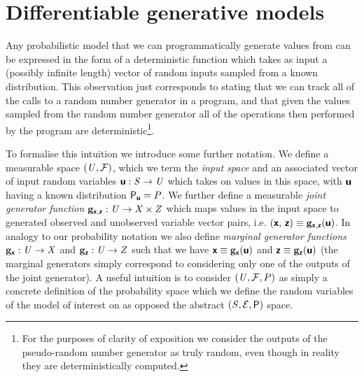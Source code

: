 \section[Differentiable generative models]{Differentiable generative models}\label{sec:differentiable-generative-models}

Any probabilistic model that we can programmatically generate values from can be expressed in the form of a deterministic function which takes as input a (possibly infinite length) vector of random inputs sampled from a known distribution. This observation just corresponds to stating that we can track all of the calls to a random number generator in a program, and that given the values sampled from the random number generator all of the operations then performed by the program are deterministic\footnote{For the purposes of clarity of exposition we consider the outputs of the pseudo-random number generator as truly random, even though in reality they are deterministically computed.}.

To formalise this intuition we introduce some further notation. We define a measurable space $(\mathit{U},\mathcal{F})$, which we term the \emph{input space} and an associated vector of input random variables $\boldsymbol{\mathsf{u}} : \mathit{S} \to \mathit{U}$ which takes on values in this space, with $\boldsymbol{\mathsf{u}}$ having a known distribution $\mathsf{P}_{\boldsymbol{\mathsf{u}}} = P$. We further define a measurable \emph{joint generator function} ${\mathbf{g}}_{\boldsymbol{\mathsf{x}},\boldsymbol{\mathsf{z}}} : \mathit{U} \to \mathit{X} \times \mathit{Z}$ which maps values in the input space to generated observed and unobserved variable vector pairs, i.e. $(\boldsymbol{\mathsf{x}},\,\boldsymbol{\mathsf{z}}) \equiv {\mathbf{g}}_{\boldsymbol{\mathsf{x}},\boldsymbol{\mathsf{z}}}(\boldsymbol{\mathsf{u}})$. In analogy to our probability notation we also define \emph{marginal generator functions} ${\mathbf{g}}_{\boldsymbol{\mathsf{x}}} : \mathit{U} \to \mathit{X}$ and ${\mathbf{g}}_{\boldsymbol{\mathsf{z}}} : \mathit{U} \to \mathit{Z}$ such that we have $\boldsymbol{\mathsf{x}} \equiv {\mathbf{g}}_{\boldsymbol{\mathsf{x}}}(\boldsymbol{\mathsf{u}})$ and $\boldsymbol{\mathsf{z}} \equiv {\mathbf{g}}_{\boldsymbol{\mathsf{z}}}(\boldsymbol{\mathsf{u}})$ (the marginal generators simply correspond to considering only one of the outputs of the joint generator). A useful intuition is to consider $(\mathit{U},\mathcal{F},P)$ as simply a concrete definition of the probability space which we define the random variables of the model of interest on as opposed the abstract $(\mathit{S}, \mathcal{E}, \mathsf{P})$ space. 

